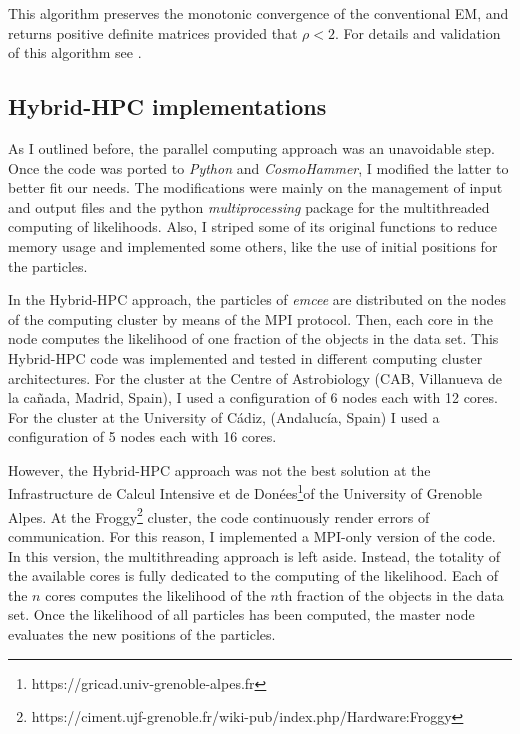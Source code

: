  This algorithm preserves the monotonic convergence of the conventional EM, and returns positive definite matrices provided that $\rho < 2$. For details and validation of this algorithm see \citet{McMichael1996}.

\subsection{Hybrid-HPC implementations}
\label{sect:HHPC}
As I outlined before, the parallel computing approach was an unavoidable step. Once the code was ported to \emph{Python} and \emph{CosmoHammer}, I modified the latter to better fit our needs. The modifications were mainly on the management of input and output files and the python \emph{multiprocessing} package for the multithreaded computing of likelihoods. Also, I striped some of its original functions to reduce memory usage and implemented some others, like the use of initial positions for the particles.

In the Hybrid-HPC approach, the particles of \emph{emcee} are distributed on the nodes of the computing cluster by means of the MPI protocol. Then, each core in the node computes the likelihood of one fraction of the objects in the data set. This Hybrid-HPC code was implemented and tested in different computing cluster architectures. For the cluster at the Centre of Astrobiology (CAB, Villanueva de la ca\~nada, Madrid, Spain), I used a configuration of 6 nodes each with 12 cores. For the cluster at the University of C\'adiz, (Andalucía, Spain) I used a configuration of 5 nodes each with 16 cores.

However, the  Hybrid-HPC approach was not the best solution at the Infrastructure de Calcul Intensive et de Donées\footnote{https://gricad.univ-grenoble-alpes.fr}of the University of Grenoble Alpes. At the Froggy\footnote{https://ciment.ujf-grenoble.fr/wiki-pub/index.php/Hardware:Froggy} cluster, the code continuously render errors of communication. For this reason, I implemented a MPI-only version of the code. In this version, the multithreading approach is left aside. Instead, the totality of the available cores is fully dedicated to the computing of the likelihood. Each of the $n$ cores computes the likelihood of the $n$th fraction of the objects in the data set. Once the likelihood of all particles has been computed, the master node evaluates the new positions of the particles.

